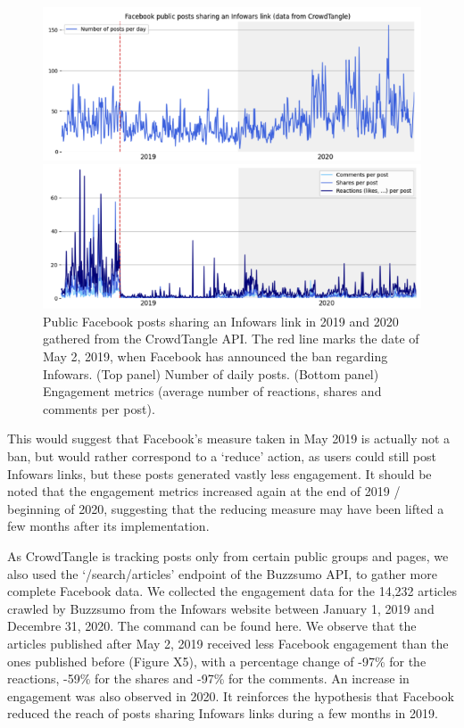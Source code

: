 \documentclass[11pt,a4paper]{article}
\begin{document}
\begin{figure}
	\centering
	
	\begin{multicols}{1}
		\includegraphics[scale=0.3]{./img/infowars/fb_infowars_1.png}
	\end{multicols}
	
	\begin{multicols}{1}
		\includegraphics[scale=0.3]{./img/infowars/fb_infowars_2.png} 
	\end{multicols}
	
	\caption{Public Facebook posts sharing an Infowars link in 2019 and 2020 gathered from the CrowdTangle API. The red line marks the date of May 2, 2019, when Facebook has announced the ban regarding Infowars. (Top panel) Number of daily posts. (Bottom panel) Engagement metrics (average number of reactions, shares and comments per post). }
	\label{infowars1}
\end{figure}


This would suggest that Facebook’s measure taken in May 2019 is actually not a ban, but would rather correspond to a ‘reduce’ action, as users could still post Infowars links, but these posts generated vastly less engagement. It should be noted that the engagement metrics increased again at the end of 2019 / beginning of 2020, suggesting that the reducing measure may have been lifted a few months after its implementation.

As CrowdTangle is tracking posts only from certain public groups and pages, we also used the ‘/search/articles’ endpoint of the Buzzsumo API, to gather more complete Facebook data. We collected the engagement data for the 14,232 articles crawled by Buzzsumo from the Infowars website between January 1, 2019 and Decembre 31, 2020. The command can be found here.
We observe that the articles published after May 2, 2019 received less Facebook engagement than the ones published before (Figure X5), with a percentage change of -97\% for the reactions, -59\% for the shares and -97\% for the comments. An increase in engagement was also observed in 2020. It reinforces the hypothesis that Facebook reduced the reach of posts sharing Infowars links during a few months in 2019.
\end{document}
